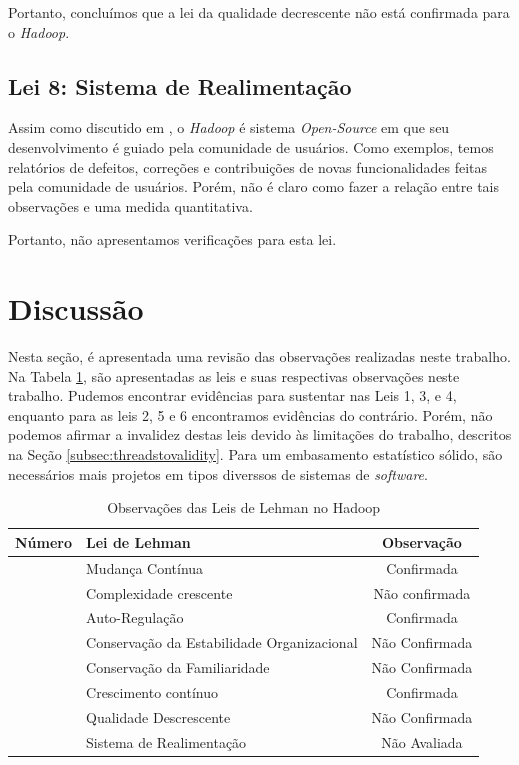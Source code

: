 Portanto, concluímos que a lei da qualidade decrescente não está confirmada para o \textit{Hadoop}.

\subsection{Lei 8: Sistema de Realimentação}

Assim como discutido em \cite{israeli2010linux}, o \textit{Hadoop} é sistema \textit{Open-Source} em que seu desenvolvimento é guiado pela comunidade de usuários. Como exemplos, temos relatórios de defeitos, correções e contribuições de novas funcionalidades feitas pela comunidade de usuários. Porém, não é claro como fazer a relação entre tais observações e uma medida quantitativa. 

Portanto, não apresentamos verificações para esta lei.

\section{Discussão}

Nesta seção, é apresentada uma revisão das observações realizadas neste trabalho. Na Tabela \ref{table:lawobservations}, são apresentadas as leis e suas respectivas observações neste trabalho. Pudemos encontrar evidências para sustentar nas Leis 1, 3, e 4, enquanto para as leis 2, 5 e 6 encontramos evidências do contrário. Porém, não podemos afirmar a invalidez destas leis devido às limitações do trabalho, descritos na Seção \ref{subsec:threadstovalidity}. Para um embasamento estatístico sólido, são necessários mais projetos em tipos diverssos de sistemas de \textit{software}.
\begin{table}[h]
	\begin{center}
		\begin{tabular}{|>{\centering}p{}|>{\centering}p{}|c|}
			\hline 
			Número & Lei de Lehman & Observação\tabularnewline
			\hline 
			\hline 
			1 & Mudança Contínua & Confirmada\tabularnewline
			\hline 
			2 & Complexidade crescente & Não confirmada\tabularnewline
			\hline 
			3 & Auto-Regulação & Confirmada\tabularnewline
			\hline 
			4 & Conservação da Estabilidade Organizacional & Não Confirmada\tabularnewline
			\hline 
			5 & Conservação da Familiaridade & Não Confirmada\tabularnewline
			\hline 
			6 & Crescimento contínuo & Confirmada\tabularnewline
			\hline 
			7 & Qualidade Descrescente & Não Confirmada\tabularnewline
			\hline 
			8 & Sistema de Realimentação & Não Avaliada\tabularnewline
			\hline 
		\end{tabular}
	\par\end{center}
	\caption{Observações das Leis de Lehman no Hadoop}
	\label{table:lawobservations}
\end{table}

